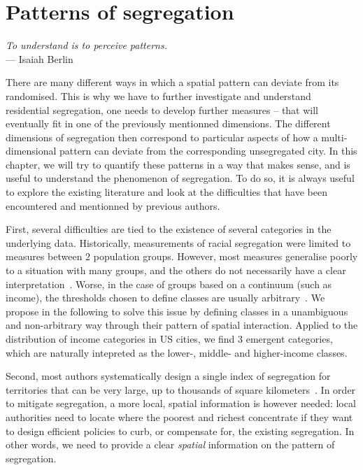 %
\chapter{Patterns of segregation}
\label{chap:patterns_segregation}

\begin{flushright}{\slshape    
To understand is to perceive patterns.} \\ \medskip
--- Isaiah Berlin~\cite{Berlin:2013}
\end{flushright}


\bigskip


There are many different ways in which a spatial pattern can deviate from its
randomised. This is why we have to further investigate and understand
residential segregation, one needs to develop further measures -- that will
eventually fit in one of the previously mentionned dimensions. The different
dimensions of segregation then correspond to particular aspects of how a
multi-dimensional pattern can deviate from the corresponding unsegregated city.
In this chapter, we will try to quantify these patterns in a way that makes
sense, and is useful to understand the phenomenon of segregation. To do so, it
is always useful to explore the existing literature and look at the difficulties
that have been encountered and mentionned by previous authors.

First, several difficulties are tied to the existence of several categories in
the underlying data. Historically, measurements of racial segregation were
limited to measures between $2$ population groups. However, most measures
generalise poorly to a situation with many groups, and the others do not
necessarily have a clear interpretation~\cite{Reardon:2002}. Worse, in the case
of groups based on a continuum (such as income), the thresholds chosen to define
classes are usually arbitrary~\cite{Jargowsky:1996}. We propose in the following
to solve this issue by defining classes in a unambiguous and non-arbitrary way
through their pattern of spatial interaction. Applied to the distribution of
income categories in US cities, we find $3$ emergent categories, which are
naturally intepreted as the lower-, middle- and higher-income classes. 

Second, most authors systematically design a single index of segregation for
territories that can be very large, up to thousands of square
kilometers~\cite{Apparicio:2000}. In order to mitigate segregation, a more
local, spatial information is however needed: local authorities need to locate
where the poorest and richest concentrate if they want to design efficient
policies to curb, or compensate for, the existing segregation. In other words,
we need to provide a clear {\it spatial} information on the pattern of
segregation. 

